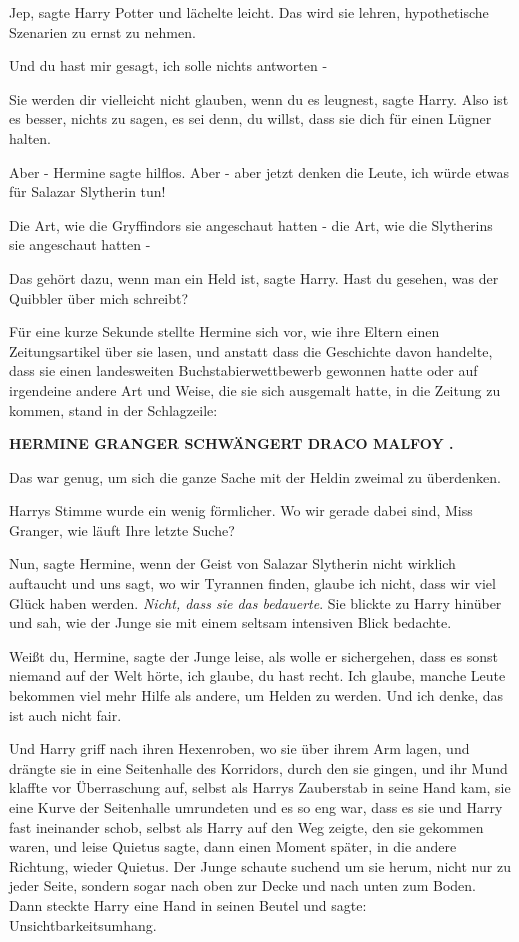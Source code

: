 \glqq{}Jep\grqq{}, sagte Harry Potter und lächelte leicht. \glqq{}Das wird sie
lehren, hypothetische Szenarien zu ernst zu nehmen.\grqq{}

\glqq{}Und du hast mir gesagt, ich solle nichts antworten -\grqq{}

\glqq{}Sie werden dir vielleicht nicht glauben, wenn du es leugnest\grqq{}, sagte
Harry. \glqq{}Also ist es besser, nichts zu sagen, es sei denn, du willst, dass
sie dich für einen Lügner halten.\grqq{}

\glqq{}Aber -\grqq{} Hermine sagte hilflos. \glqq{}Aber - aber jetzt denken die
Leute, ich würde etwas für Salazar Slytherin tun!\grqq{}

Die Art, wie die Gryffindors sie angeschaut hatten - die Art, wie die Slytherins
sie angeschaut hatten -

\glqq{}Das gehört dazu, wenn man ein Held ist\grqq{}, sagte Harry. \glqq{}Hast du
gesehen, was der Quibbler über mich schreibt?\grqq{}

Für eine kurze Sekunde stellte Hermine sich vor, wie ihre Eltern einen
Zeitungsartikel über sie lasen, und anstatt dass die Geschichte davon handelte,
dass sie einen landesweiten Buchstabierwettbewerb gewonnen hatte oder auf
irgendeine andere Art und Weise, die sie sich ausgemalt hatte, in die Zeitung zu
kommen, stand in der Schlagzeile:

\textbf{\glqq{}HERMINE GRANGER
SCHWÄNGERT DRACO MALFOY \glqq{}.}

Das war genug, um sich die ganze Sache mit der Heldin zweimal zu überdenken.

Harrys Stimme wurde ein wenig förmlicher. \glqq{}Wo wir gerade dabei sind, Miss
Granger, wie läuft Ihre letzte Suche?\grqq{}

\glqq{}Nun\grqq{}, sagte Hermine, \glqq{}wenn der Geist von Salazar Slytherin
nicht wirklich auftaucht und uns sagt, wo wir Tyrannen finden, glaube ich nicht,
dass wir viel Glück haben werden.\grqq{} \emph{Nicht, dass sie das bedauerte}.
Sie blickte zu Harry hinüber und sah, wie der Junge sie mit einem seltsam
intensiven Blick bedachte.

\glqq{}Weißt du, Hermine\grqq{}, sagte der Junge leise, als wolle er sichergehen,
dass es sonst niemand auf der Welt hörte, \glqq{}ich glaube, du hast recht. Ich
glaube, manche Leute bekommen viel mehr Hilfe als andere, um Helden zu werden.
Und ich denke, das ist auch nicht fair.\grqq{}

Und Harry griff nach ihren Hexenroben, wo sie über ihrem Arm lagen, und drängte
sie in eine Seitenhalle des Korridors, durch den sie gingen, und ihr Mund
klaffte vor Überraschung auf, selbst als Harrys Zauberstab in seine Hand kam,
sie eine Kurve der Seitenhalle umrundeten und es so eng war, dass es sie und
Harry fast ineinander schob, selbst als Harry auf den Weg zeigte, den sie
gekommen waren, und leise \glqq{}Quietus\grqq{} sagte, dann einen Moment später,
in die andere Richtung, wieder \glqq{}Quietus\grqq{}. Der Junge schaute suchend
um sie herum, nicht nur zu jeder Seite, sondern sogar nach oben zur Decke und
nach unten zum Boden. Dann steckte Harry eine Hand in seinen Beutel und sagte:
\glqq{}Unsichtbarkeitsumhang.\grqq{}

